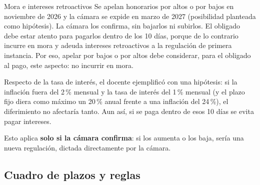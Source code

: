 \documentclass[12pt,oneside]{book}
\begin{document}
\begin{example}{Mora e intereses retroactivos}
Se apelan honorarios por altos o por bajos en noviembre de 2026 y la cámara se expide en marzo de 2027 (posibilidad planteada como hipótesis). La cámara los confirma, sin bajarlos ni subirlos. El obligado debe estar atento para pagarlos dentro de los 10 días, porque de lo contrario incurre en mora y adeuda intereses retroactivos a la regulación de primera instancia. Por eso, apelar por bajos o por altos debe considerar, para el obligado al pago, este aspecto: no incurrir en mora.
\end{example}

Respecto de la tasa de interés, el docente ejemplificó con una hipótesis: si la inflación fuera del 2\,\% mensual y la tasa de interés del 1\,\% mensual (y el plazo fijo diera como máximo un 20\,\% anual frente a una inflación del 24\,\%), el diferimiento no afectaría tanto. Aun así, si se paga dentro de esos 10 días se evita pagar intereses.

Esto aplica \textbf{solo si la cámara confirma}: si los aumenta o los baja, sería una nueva regulación, dictada directamente por la cámara.

\subsection{Cuadro de plazos y reglas}
\end{document}
